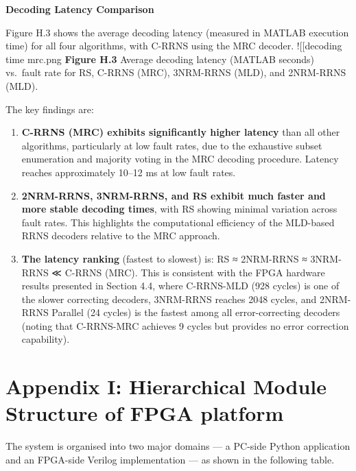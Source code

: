 \documentclass[
  12pt,
  a4paper]{report}
\begin{document}
\textbf{Decoding Latency Comparison}

Figure H.3 shows the average decoding latency (measured in MATLAB
execution time) for all four algorithms, with C-RRNS using the MRC
decoder. !{[}{[}decoding time mrc.png\textbar461{]}{]} \textbf{Figure
H.3} Average decoding latency (MATLAB seconds) vs.~fault rate for RS,
C-RRNS (MRC), 3NRM-RRNS (MLD), and 2NRM-RRNS (MLD).

The key findings are:

\begin{enumerate}
\def\labelenumi{\arabic{enumi}.}
\item
  \textbf{C-RRNS (MRC) exhibits significantly higher latency} than all
  other algorithms, particularly at low fault rates, due to the
  exhaustive subset enumeration and majority voting in the MRC decoding
  procedure. Latency reaches approximately 10--12 ms at low fault rates.
\item
  \textbf{2NRM-RRNS, 3NRM-RRNS, and RS exhibit much faster and more
  stable decoding times}, with RS showing minimal variation across fault
  rates. This highlights the computational efficiency of the MLD-based
  RRNS decoders relative to the MRC approach.
\item
  \textbf{The latency ranking} (fastest to slowest) is: RS ≈ 2NRM-RRNS ≈
  3NRM-RRNS ≪ C-RRNS (MRC). This is consistent with the FPGA hardware
  results presented in Section 4.4, where C-RRNS-MLD (928 cycles) is one
  of the slower correcting decoders, 3NRM-RRNS reaches 2048 cycles, and
  2NRM-RRNS Parallel (24 cycles) is the fastest among all
  error-correcting decoders (noting that C-RRNS-MRC achieves 9 cycles
  but provides no error correction capability).
\end{enumerate}

\section{Appendix I: Hierarchical Module Structure of FPGA
platform}\label{appendix-i-hierarchical-module-structure-of-fpga-platform}

The system is organised into two major domains --- a PC-side Python
application and an FPGA-side Verilog implementation --- as shown in the
following table.
\end{document}
